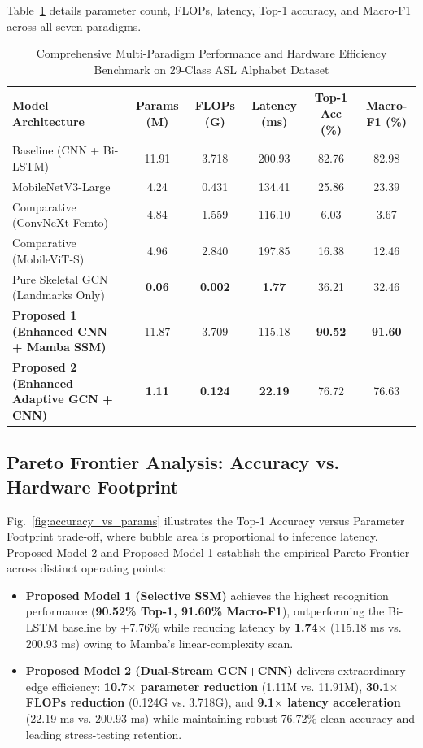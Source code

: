 \documentclass[journal]{IEEEtran}
\begin{document}
Table~\ref{tab:benchmark} details parameter count, FLOPs, latency, Top-1 accuracy, and Macro-F1 across all seven paradigms.

\begin{table}[t]
\centering
\caption{Comprehensive Multi-Paradigm Performance and Hardware Efficiency Benchmark on 29-Class ASL Alphabet Dataset}
\label{tab:benchmark}
\begin{tabular}{lccccc}
\toprule
\textbf{Model Architecture} & \textbf{Params (M)} & \textbf{FLOPs (G)} & \textbf{Latency (ms)} & \textbf{Top-1 Acc (\%)} & \textbf{Macro-F1 (\%)} \\
\midrule
Baseline (CNN + Bi-LSTM) & 11.91 & 3.718 & 200.93 & 82.76 & 82.98 \\
MobileNetV3-Large & 4.24 & 0.431 & 134.41 & 25.86 & 23.39 \\
Comparative (ConvNeXt-Femto) & 4.84 & 1.559 & 116.10 & 6.03 & 3.67 \\
Comparative (MobileViT-S) & 4.96 & 2.840 & 197.85 & 16.38 & 12.46 \\
Pure Skeletal GCN (Landmarks Only) & \textbf{0.06} & \textbf{0.002} & \textbf{1.77} & 36.21 & 32.46 \\
\midrule
\textbf{Proposed 1 (Enhanced CNN + Mamba SSM)} & 11.87 & 3.709 & 115.18 & \textbf{90.52} & \textbf{91.60} \\
\textbf{Proposed 2 (Enhanced Adaptive GCN + CNN)} & \textbf{1.11} & \textbf{0.124} & \textbf{22.19} & 76.72 & 76.63 \\
\bottomrule
\end{tabular}
\end{table}

\subsection{Pareto Frontier Analysis: Accuracy vs. Hardware Footprint}
Fig.~\ref{fig:accuracy_vs_params} illustrates the Top-1 Accuracy versus Parameter Footprint trade-off, where bubble area is proportional to inference latency. Proposed Model 2 and Proposed Model 1 establish the empirical Pareto Frontier across distinct operating points:
\begin{itemize}
    \item \textbf{Proposed Model 1 (Selective SSM)} achieves the highest recognition performance (\textbf{90.52\% Top-1, 91.60\% Macro-F1}), outperforming the Bi-LSTM baseline by +7.76\% while reducing latency by \textbf{1.74$\times$} (115.18 ms vs. 200.93 ms) owing to Mamba's linear-complexity scan.
    \item \textbf{Proposed Model 2 (Dual-Stream GCN+CNN)} delivers extraordinary edge efficiency: \textbf{10.7$\times$ parameter reduction} (1.11M vs. 11.91M), \textbf{30.1$\times$ FLOPs reduction} (0.124G vs. 3.718G), and \textbf{9.1$\times$ latency acceleration} (22.19 ms vs. 200.93 ms) while maintaining robust 76.72\% clean accuracy and leading stress-testing retention.
\end{itemize}
\end{document}
